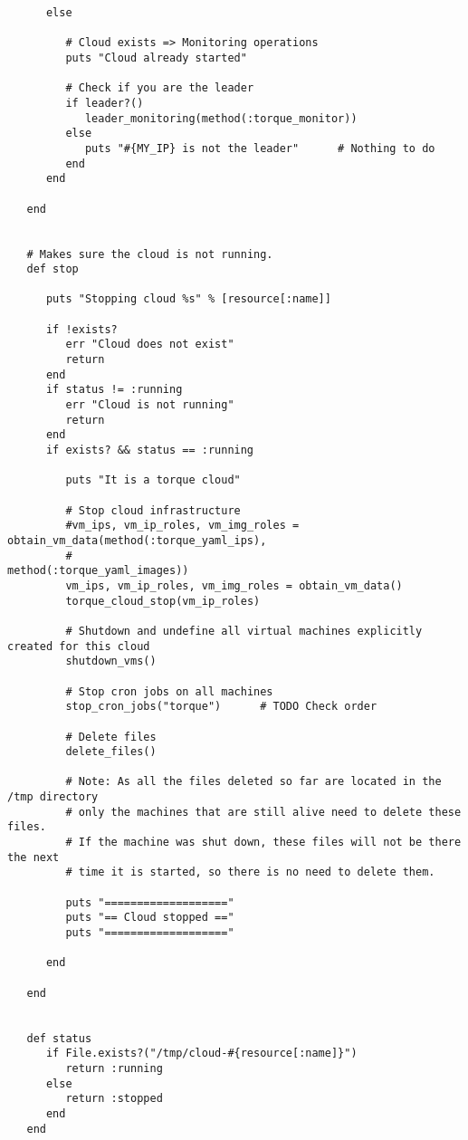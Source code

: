 \begin{lstlisting}
      else
         
         # Cloud exists => Monitoring operations
         puts "Cloud already started"

         # Check if you are the leader
         if leader?()
            leader_monitoring(method(:torque_monitor))
         else
            puts "#{MY_IP} is not the leader"      # Nothing to do
         end
      end
      
   end


   # Makes sure the cloud is not running.
   def stop

      puts "Stopping cloud %s" % [resource[:name]]

      if !exists?
         err "Cloud does not exist"
         return
      end
      if status != :running
         err "Cloud is not running"
         return
      end
      if exists? && status == :running
         
         puts "It is a torque cloud"
         
         # Stop cloud infrastructure
         #vm_ips, vm_ip_roles, vm_img_roles = obtain_vm_data(method(:torque_yaml_ips),
         #                                                   method(:torque_yaml_images))
         vm_ips, vm_ip_roles, vm_img_roles = obtain_vm_data()
         torque_cloud_stop(vm_ip_roles)
         
         # Shutdown and undefine all virtual machines explicitly created for this cloud
         shutdown_vms()
         
         # Stop cron jobs on all machines
         stop_cron_jobs("torque")      # TODO Check order
         
         # Delete files
         delete_files()
         
         # Note: As all the files deleted so far are located in the /tmp directory
         # only the machines that are still alive need to delete these files.
         # If the machine was shut down, these files will not be there the next
         # time it is started, so there is no need to delete them.
         
         puts "==================="
         puts "== Cloud stopped =="
         puts "==================="
         
      end
   
   end


   def status
      if File.exists?("/tmp/cloud-#{resource[:name]}")
         return :running
      else
         return :stopped
      end
   end



\end{lstlisting}

